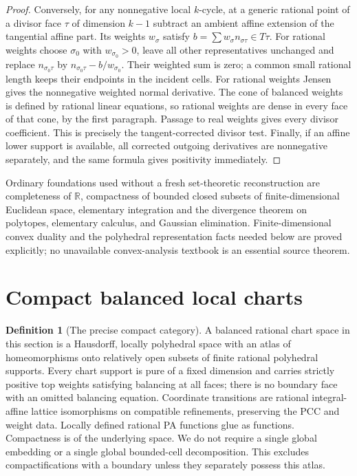 \documentclass[11pt]{article}
\theoremstyle{definition}\newtheorem{definition}[theorem]{Definition}
\theoremstyle{remark}\newtheorem{remark}[theorem]{Remark}
\newcommand{\R}{\mathbb R}\newcommand{\Q}{\mathbb Q}\newcommand{\Z}{\mathbb Z}
\begin{document}
\begin{proof}
Conversely, for any nonnegative local $k$-cycle, at a generic rational point of a divisor face $\tau$ of dimension $k-1$ subtract an ambient affine extension of the tangential affine part. Its weights $w_\sigma$ satisfy $b=\sum w_\sigma n_{\sigma\tau}\in T\tau$. For rational weights choose $\sigma_0$ with $w_{\sigma_0}>0$, leave all other representatives unchanged and replace $n_{\sigma_0\tau}$ by $n_{\sigma_0\tau}-b/w_{\sigma_0}$. Their weighted sum is zero; a common small rational length keeps their endpoints in the incident cells. For rational weights Jensen gives the nonnegative weighted normal derivative. The cone of balanced weights is defined by rational linear equations, so rational weights are dense in every face of that cone, by the first paragraph. Passage to real weights gives every divisor coefficient. This is precisely the tangent-corrected divisor test. Finally, if an affine lower support is available, all corrected outgoing derivatives are nonnegative separately, and the same formula gives positivity immediately.
\end{proof}

Ordinary foundations used without a fresh set-theoretic reconstruction are completeness of $\R$, compactness of bounded closed subsets of finite-dimensional Euclidean space, elementary integration and the divergence theorem on polytopes, elementary calculus, and Gaussian elimination. Finite-dimensional convex duality and the polyhedral representation facts needed below are proved explicitly; no unavailable convex-analysis textbook is an essential source theorem.

\section{Compact balanced local charts}
\begin{definition}[The precise compact category]\label{def:chart}
A balanced rational chart space in this section is a Hausdorff, locally polyhedral space with an atlas of homeomorphisms onto relatively open subsets of finite rational polyhedral supports. Every chart support is pure of a fixed dimension and carries strictly positive top weights satisfying balancing at all faces; there is no boundary face with an omitted balancing equation. Coordinate transitions are rational integral-affine lattice isomorphisms on compatible refinements, preserving the PCC and weight data. Locally defined rational PA functions glue as functions. Compactness is of the underlying space. We do not require a single global embedding or a single global bounded-cell decomposition. This excludes compactifications with a boundary unless they separately possess this atlas.
\end{definition}
\end{document}
